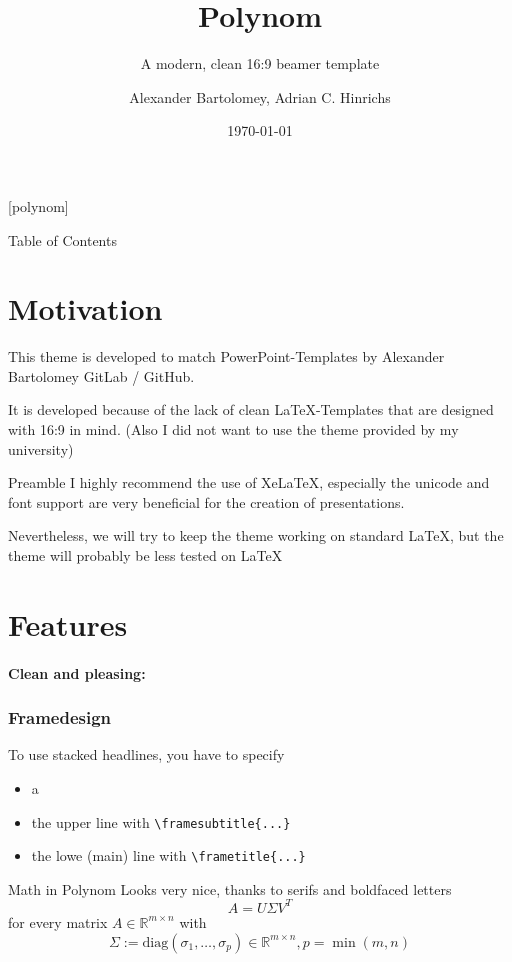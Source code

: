 \documentclass[fragile]{beamer}
\title{Polynom}
\subtitle{A modern, clean 16:9 beamer template}
\author{Alexander Bartolomey, Adrian C. Hinrichs}
\date{\today}
\begin{document}
[polynom]{}
\begin{frame}
  \titlepage
\end{frame}

\begin{frame}[fragile]{Table of Contents}
  \tableofcontents
\end{frame}


\section{Motivation}
\begin{frame}
  This theme is developed to match PowerPoint-Templates by Alexander
  Bartolomey GitLab / GitHub.

  It is developed because of the lack of clean \LaTeX-Templates that
  are designed with 16:9 in mind.  (Also I did not want to use the
  theme provided by my university)
\end{frame}

\begin{frame}{Preamble}
  I highly recommend the use of XeLaTeX, especially the unicode and
  font support are very beneficial for the creation of presentations.

  Nevertheless, we will try to keep the theme working on standard
  \LaTeX, but the theme will probably be less tested on \LaTeX
\end{frame}

\section{Features}
\begin{frame}[fragile]
  \framesubtitle{Clean and pleasing:}
  \frametitle{Framedesign}
  To use stacked headlines, you have to specify
  \begin{itemize}
    \item a
    \item the upper line with \lstinline|\framesubtitle{...}|
    \item the lowe (main) line with \lstinline|\frametitle{...}|
  \end{itemize}
\end{frame}

\begin{frame}{Math in Polynom}
  Looks very nice, thanks to serifs and boldfaced letters
   \[ A=U\Sigma V^T\]
   for every matrix \( A\in \mathbb{R}^{m\times n}\) with
   \[\Sigma:=\mathrm{diag}(\sigma_1,\dots,\sigma_p) \in \mathbb{R}^{m\times n}, p = \min(m,n)\]
\end{frame}
\end{document}

